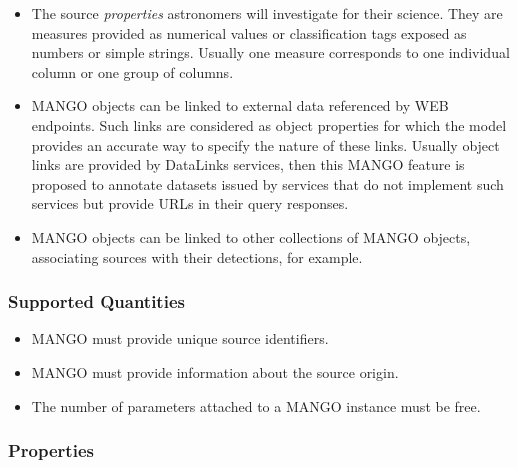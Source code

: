 \documentclass[11pt,a4paper]{ivoa}
\begin{document}
\begin{itemize}
    \item The source \emph{properties} astronomers will investigate for their science.
          They are measures provided as numerical values or classification tags exposed as
          numbers or simple strings. 
          Usually one measure corresponds to one individual column or one group of columns.
        
    \item MANGO objects can be linked to external data referenced by WEB endpoints.
          Such links are considered as object properties for which the model provides 
          an accurate way to specify the nature of these links. 
          Usually object links are provided by DataLinks services,
          then this MANGO feature is proposed to annotate datasets issued by services
          that do not implement such services but provide URLs in their query responses.
          
    \item MANGO objects can be linked to other collections of MANGO objects,
          associating sources with their detections, for example.
 \end{itemize}
  

\subsubsection{Supported Quantities}
\begin{itemize}
    \item MANGO must provide unique source identifiers.
    \item MANGO must provide information about the source origin.
    \item The number of parameters attached to a MANGO instance must be free.
\end{itemize}

\subsubsection{Properties}
\end{document}
